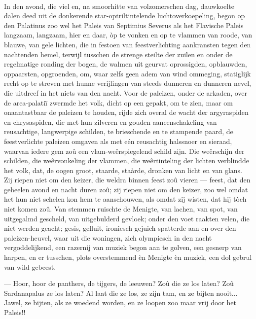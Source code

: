 \documentclass[a4paper, 12pt, oneside, dutch]{article}
\begin{document}
\paragraph{}
In den avond, die viel en, na smoorhitte van volzomerschen dag, dauwkoelte dalen deed uit de donkerende star-optriltintelende luchtoverkoepeling, begon op den Palatinus zoo wel het Paleis van Septimius Severus als het Flavische Paleis langzaam, langzaam, hier en daar, òp te vonken en op te vlammen van roode, van blauwe, van gele lichten, die in festoen van feestverlichting aankransten tegen den nachtenden hemel, terwijl tusschen de strenge steilte der zuilen en onder de regelmatige ronding der bogen, de walmen uit geurvat oprossigden, opblauwden, oppaarsten, opgroenden, om, waar zelfs geen adem van wind ommeging, statiglijk recht op te streven met hunne verijlingen van steeds dunneren en dunneren nevel, die uitdreef in het niets van den nacht. Voor de paleizen, onder de arkaden, over de area-palatiï zwermde het volk, dicht op een gepakt, om te zien, maar om onaantastbaar de paleizen te houden, rijde zich overal de wacht der argyraspiden en chrysaspiden, die met hun zilveren en gouden aaneenschakeling van reusachtige, langwerpige schilden, te brieschende en te stampende paard, de feestverlichte paleizen omgaven als met eén reusachtig halssnoer en sieraad, waarvan iedere gem zoû een vlam-weêrspiegelend schild zijn. Die weêrschijn der schilden, die weêrvonkeling der vlammen, die weêrtinteling der lichten verblindde het volk, dat, de oogen groot, staarde, staàrde, dronken van licht en van glans. Zij riepen niet om den keizer, die weldra binnen feest zoû vieren --- feest, dat den geheelen avond en nacht duren zoû; zij riepen niet om den keizer, zoo wel omdat het hun niet schelen kon hem te aanschouwen, als omdat zij wisten, dat hij tòch niet komen zoû. Van stemmen ruischte de Menigte, van lachen, van spot, van uitgegalmd gescheld, van uitgebulderd gevloek; onder den voet raakten velen, die niet werden geacht; gesis, gefluit, ironiesch gejuich spatterde aan en over den paleizen-heuvel, waar uit die woningen, zich olympiesch in den nacht vergoddelijkend, een razernij van muziek begon aan te golven, een gesnerp van harpen, en er tusschen, plots overstemmend èn Menigte èn muziek, een dol gebrul van wild gebeest.

--- Hoor, hoor de panthers, de tijgers, de leeuwen? Zoû die ze los laten? Zoû Sardanapalus ze los laten? Al laat die ze los, ze zijn tam, en ze bijten nooit... Jawel, ze bijten, als ze woedend worden, en ze loopen zoo maar vrij door het Paleis!!
\end{document}
